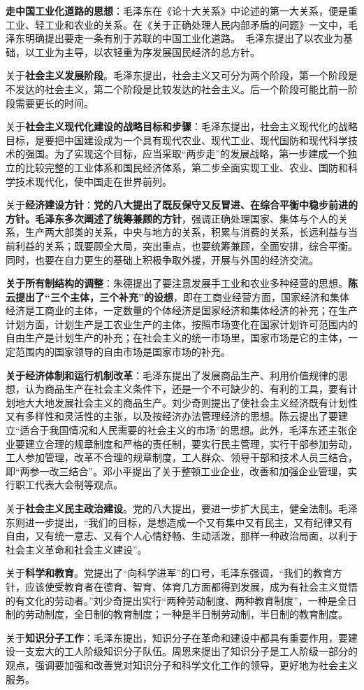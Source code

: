 {\textbf{{走中国工业化道路的思想}}：毛泽东在《论十大关系》中论述的第一大关系，便是重工业、轻工业和农业的关系。在《关于正确处理人民内部矛盾的问题》一文中，毛泽东明确提出要走一条有别于苏联的中国工业化道路。~{毛泽东提出了以农业为基础，以工业为主导，以农轻重为序发展国民经济的总方针}。}

{关于\textbf{{社会主义发展阶段}}。毛泽东提出，社{会主义又可分为两个阶段，第一个阶段是不发达的社会主义，第二个阶段是比较发达的社会主义。后一个阶段可能比前一阶段需要更长的时间。}}

{关于\textbf{{社会主义现代化建设的战略目标和步骤}}：毛泽东提出，社会主义现代化的战略目标，是要把中国建设成为一个具有{现代农业、现代工业、现代国防和现代科学技术的强国}。为了实现这个目标，应当采取``{两步走}''的发展战略，{第一步建成一个独立的比较完整的工业体系和国民经济体系，第二步全面实现工业、农业、国防和科学技术现代化，使中国走在世界前列}。}

{关于\textbf{{经济建设方针}}：\textbf{{党的八大提出了既反保守又反冒进、在综合平衡中稳步前进的方针。毛泽东多次阐述了统筹兼顾的方针}}，强调正确处理国家、集体与个人的关系，生产两大部类的关系，中央与地方的关系，积累与消费的关系，长远利益与当前利益的关系；既要顾全大局，突出重点，也要统筹兼顾，全面安排，综合平衡。同时，也要在自力更生的基础上积极争取外援，开展与外国的经济交流。}

{\textbf{{关于所有制结构的调整}}：{朱德提出了要注意发展手工业和农业多种经营的思想}。\textbf{{陈云提出了``}{三个主体，三个补充''}{的设想}}，即{在工商业经营方面，国家经济和集体经济是工商业的主体，一定数量的个体经济是国家经济和集体经济的补充；在生产计划方面，计划生产是工农业生产的主体，按照市场变化在国家计划许可范围内的自由生产是计划生产的补充；在社会主义的统一市场里，国家市场是它的主体，一定范围内的国家领导的自由市场是国家市场的补充}。}

{\textbf{{关于经济体制和运行机制改革}}：{毛泽东}提出了发展商品生产、利用价值规律的思想，认为商品生产在社会主义条件下，还是一个不可缺少的、有利的工具，要有计划地大大地发展社会主义的商品生产。{刘少奇}则提出了使社会主义经济既有计划性又有多样性和灵活性的主张，以及按经济办法管理经济的思想。{陈云}提出了要建立``适合于我国情况和人民需要的社会主义的市场''的思想。此外，{毛泽东还主张企业要建立合理的规章制度和严格的责任制}，要{实行民主管理，实行干部参加劳动，工人参加管理，改革不合理的规章制度，工人群众、领导干部和技术人员三结合，即``两参一改三结合''}。{邓小平}提出了关于整顿工业企业，改善和加强企业管理，实行职工代表大会制等观点。}

{关于\textbf{{社会主义民主政治建设}}。{党的八大提出，要进一步扩大民主，健全法制}。毛泽东则进一步提出，``{我们的目标，是想造成一个又有集中又有民主，又有纪律又有自由，又有统一意志、又有个人心情舒畅、生动活泼，那样一种政治局面，以利于社会主义革命和社会主义建设}''。}

{关于\textbf{{科学和教育}}。党提出了``{向科学进军}''的口号，毛泽东强调，``我们的教育方针，应该使受教育者在德育、智育、体育几方面都得到发展，成为有社会主义觉悟的有文化的劳动者。''{刘少奇提出实行``两种劳动制度、两种教育制度''，一种是全日制的劳动制度，全日制的教育制度；一种是半日制劳动制，半日制的教育制度}。}

{{关于}\textbf{{知识分子工作}}{：毛泽东提出，知识分子在革命和建设中都具有重要作用，要建设一支宏大的工人阶级知识分子队伍。周恩来提出了}{知识分子是工人阶级一部分}{的观点，强调要加强和改善党对知识分子和科学文化工作的领导，更好地为社会主义服务。}}
